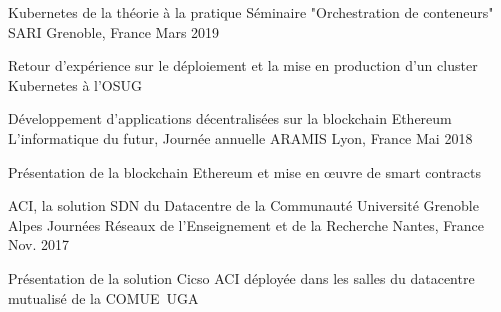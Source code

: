 

\begin{cventries}

  \cventry
    {Kubernetes de la théorie à la pratique} %
    {Séminaire "Orchestration de conteneurs" SARI} %
    {Grenoble, France} %
    {Mars 2019} %
    {
      \begin{cvitems} %
        \item {Retour d'expérience sur le déploiement et la mise en production d'un cluster Kubernetes à l'OSUG}
      \end{cvitems}
    }

  \cventry
    {Développement d'applications décentralisées sur la blockchain Ethereum} %
    {L'informatique du futur, Journée annuelle ARAMIS} %
    {Lyon, France} %
    {Mai 2018} %
    {
      \begin{cvitems} %
        \item {Présentation de la blockchain Ethereum et mise en œuvre de smart contracts}
      \end{cvitems}
    }

  \cventry
    {ACI, la solution SDN du Datacentre de la Communauté Université Grenoble Alpes} %
    {Journées Réseaux de l’Enseignement et de la Recherche} %
    {Nantes, France} %
    {Nov. 2017} %
    {
      \begin{cvitems} %
        \item {Présentation de la solution Cicso ACI déployée dans les salles du datacentre mutualisé de la COMUE UGA}
      \end{cvitems}
    }

\end{cventries}

